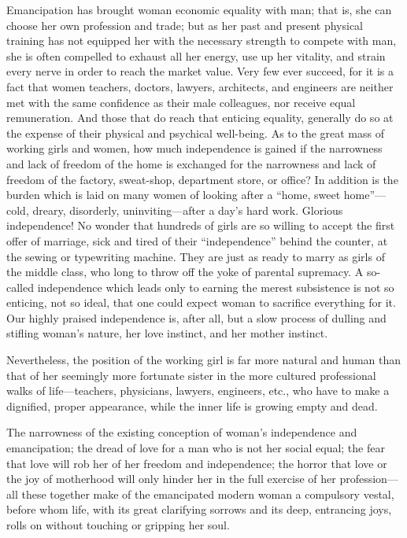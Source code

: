 Emancipation has brought woman economic equality with man; that is,
she can choose her own profession and trade; but as her past and
present physical training has not equipped her with the necessary
strength to compete with man, she is often compelled to exhaust all
her energy, use up her vitality, and strain every nerve in order to
reach the market value. Very few ever succeed, for it is a fact that
women teachers, doctors, lawyers, architects, and engineers are
neither met with the same confidence as their male colleagues, nor
receive equal remuneration. And those that do reach that enticing
equality, generally do so at the expense of their physical and
psychical well-being. As to the great mass of working girls and women,
how much independence is gained if the narrowness and lack of freedom
of the home is exchanged for the narrowness and lack of freedom of the
factory, sweat-shop, department store, or office? In addition is the
burden which is laid on many women of looking after a  ``home, sweet
home''---cold, dreary, disorderly, uninviting---after a day's hard
work. Glorious independence! No wonder that hundreds of girls are so
willing to accept the first offer of marriage, sick and tired of their
``independence'' behind the counter, at the sewing or typewriting
machine. They are just as ready to marry as girls of the middle class,
who long to throw off the yoke of parental supremacy. A so-called
independence which leads only to earning the merest subsistence is not
so  enticing, not so ideal, that one could expect woman to
sacrifice everything for it. Our highly praised independence is, after
all, but a slow process of dulling and stifling woman's nature, her
love instinct, and her mother instinct.

Nevertheless, the position of the working girl is far more natural and
human than that of her seemingly more fortunate sister in the more
cultured professional walks of life---teachers, physicians, lawyers,
engineers, etc., who have to make a dignified, proper appearance,
while the inner life is growing empty and dead.

The narrowness of the existing conception of woman's independence and
emancipation; the dread of love for a man who is not her social equal;
the fear that love will rob her of her freedom and independence; the
horror that love or the joy of motherhood will only hinder her in the
full exercise of her profession---all these together make of the
emancipated modern woman a compulsory vestal, before whom life, with
its great clarifying sorrows and its deep, entrancing joys, rolls on
without touching or gripping her soul.

